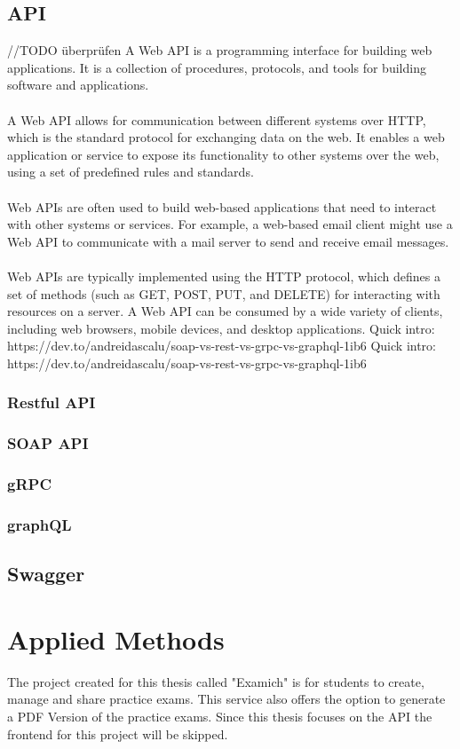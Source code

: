 \documentclass[BIF,Master,nenglish]{twbook}
\begin{document}
\section{API}
//TODO überprüfen
A Web API is a programming interface for building web applications. It is a collection of procedures, protocols, and tools for building software and applications.
\\
\\
A Web API allows for communication between different systems over HTTP, which is the standard protocol for exchanging data on the web. It enables a web application or service to expose its functionality to other systems over the web, using a set of predefined rules and standards.
\\
\\
Web APIs are often used to build web-based applications that need to interact with other systems or services. For example, a web-based email client might use a Web API to communicate with a mail server to send and receive email messages.
\\
\\
Web APIs are typically implemented using the HTTP protocol, which defines a set of methods (such as GET, POST, PUT, and DELETE) for interacting with resources on a server. A Web API can be consumed by a wide variety of clients, including web browsers, mobile devices, and desktop applications.
Quick intro:
https://dev.to/andreidascalu/soap-vs-rest-vs-grpc-vs-graphql-1ib6
Quick intro:
https://dev.to/andreidascalu/soap-vs-rest-vs-grpc-vs-graphql-1ib6
\subsection{Restful API}
\subsection{SOAP API}
\subsection{gRPC}
\subsection{graphQL}

\section{Swagger}


\clearpage
\chapter{Applied Methods}
The project created for this thesis called "Examich" is for students to create, manage and share practice exams. This service also offers the option to generate a PDF Version of the practice exams. Since this thesis focuses on the API the frontend for this project will be skipped.
\end{document}
